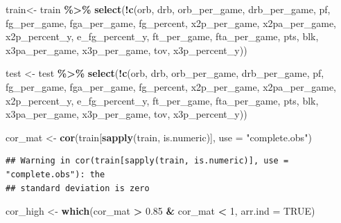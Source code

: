 \documentclass[
  11pt,
]{article}
\newenvironment{Shaded}{\begin{snugshade}}{\end{snugshade}}
\newcommand{\AttributeTok}[1]{\textcolor[rgb]{0.13,0.29,0.53}{#1}}
\newcommand{\ConstantTok}[1]{\textcolor[rgb]{0.56,0.35,0.01}{#1}}
\newcommand{\DecValTok}[1]{\textcolor[rgb]{0.00,0.00,0.81}{#1}}
\newcommand{\FloatTok}[1]{\textcolor[rgb]{0.00,0.00,0.81}{#1}}
\newcommand{\FunctionTok}[1]{\textcolor[rgb]{0.13,0.29,0.53}{\textbf{#1}}}
\newcommand{\NormalTok}[1]{#1}
\newcommand{\OtherTok}[1]{\textcolor[rgb]{0.56,0.35,0.01}{#1}}
\newcommand{\SpecialCharTok}[1]{\textcolor[rgb]{0.81,0.36,0.00}{\textbf{#1}}}
\newcommand{\StringTok}[1]{\textcolor[rgb]{0.31,0.60,0.02}{#1}}
\begin{document}
\begin{Shaded}
\begin{Highlighting}[]
\NormalTok{train}\OtherTok{\textless{}{-}}\NormalTok{ train }\SpecialCharTok{\%\textgreater{}\%} 
  \FunctionTok{select}\NormalTok{(}\SpecialCharTok{!}\FunctionTok{c}\NormalTok{(orb, drb, orb\_per\_game, drb\_per\_game, pf, fg\_per\_game, fga\_per\_game, fg\_percent, x2p\_per\_game, x2pa\_per\_game, x2p\_percent\_y, e\_fg\_percent\_y, ft\_per\_game, fta\_per\_game, pts, blk, x3pa\_per\_game, x3p\_per\_game, tov, x3p\_percent\_y))}

\NormalTok{test }\OtherTok{\textless{}{-}}\NormalTok{ test }\SpecialCharTok{\%\textgreater{}\%} 
  \FunctionTok{select}\NormalTok{(}\SpecialCharTok{!}\FunctionTok{c}\NormalTok{(orb, drb, orb\_per\_game, drb\_per\_game, pf, fg\_per\_game, fga\_per\_game, fg\_percent, x2p\_per\_game, x2pa\_per\_game, x2p\_percent\_y, e\_fg\_percent\_y, ft\_per\_game, fta\_per\_game, pts, blk, x3pa\_per\_game, x3p\_per\_game, tov, x3p\_percent\_y))}

\NormalTok{cor\_mat }\OtherTok{\textless{}{-}} \FunctionTok{cor}\NormalTok{(train[}\FunctionTok{sapply}\NormalTok{(train, is.numeric)], }\AttributeTok{use =} \StringTok{"complete.obs"}\NormalTok{)}
\end{Highlighting}
\end{Shaded}

\begin{verbatim}
## Warning in cor(train[sapply(train, is.numeric)], use = "complete.obs"): the
## standard deviation is zero
\end{verbatim}

\begin{Shaded}
\begin{Highlighting}[]
\NormalTok{cor\_high }\OtherTok{\textless{}{-}} \FunctionTok{which}\NormalTok{(cor\_mat }\SpecialCharTok{\textgreater{}} \FloatTok{0.85} \SpecialCharTok{\&}\NormalTok{ cor\_mat }\SpecialCharTok{\textless{}} \DecValTok{1}\NormalTok{, }\AttributeTok{arr.ind =} \ConstantTok{TRUE}\NormalTok{)}
\end{Highlighting}
\end{Shaded}
\end{document}

